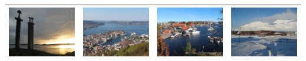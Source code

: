 \begin{small}
\begin{center}
\begin{longtable}{|c|c|c|c|}
 \hyperref[sec:UiS]{\includegraphics[keepaspectratio,width=9em,height=6em]{NorNet-Configuration-Images/Universitetet_i_Stavanger.jpeg}} & \hyperref[sec:UiB]{\includegraphics[keepaspectratio,width=9em,height=6em]{NorNet-Configuration-Images/Universitetet_i_Bergen.jpeg}} & \hyperref[sec:UiA]{\includegraphics[keepaspectratio,width=9em,height=6em]{NorNet-Configuration-Images/Universitetet_i_Agder.jpeg}} & \hyperref[sec:UNIS]{\includegraphics[keepaspectratio,width=9em,height=6em]{NorNet-Configuration-Images/Universitetet_paa_Svalbard.jpeg}} \\ \hline

\end{longtable}
\end{center}
\end{small}
